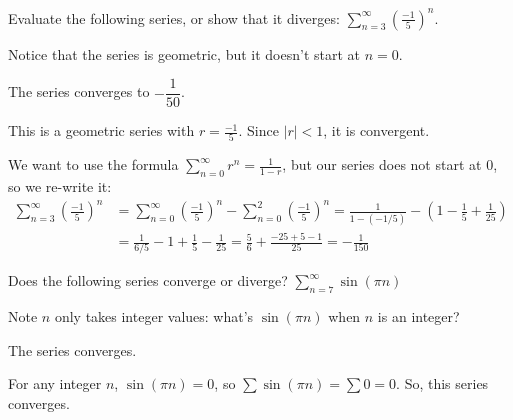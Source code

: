 



\begin{Mquestion}
Evaluate the following series, or show that it diverges:
$\displaystyle\sum_{n=3}^\infty \left(\frac{-1}{5}\right)^n$.
\end{Mquestion}

\begin{hint}
Notice that the series is geometric, but it doesn't start at $n=0$.
\end{hint}

\begin{answer}
The series converges to $-\dfrac{1}{50}$.
\end{answer}

\begin{solution}
This is a geometric series with $r=\frac{-1}{5}$. Since $|r|<1$, it is convergent.

We want to use the formula $\sum_{n=0}^\infty r^n=\frac{1}{1-r}$, but our series does not start at 0, so we re-write it:
\begin{align*}
\sum_{n=3}^\infty \left(\frac{-1}{5}\right)^n&=
\sum_{n=0}^\infty \left(\frac{-1}{5}\right)^n-
\sum_{n=0}^2 \left(\frac{-1}{5}\right)^n
=\frac{1}{1-(-1/5)} - \left(1-\frac{1}{5}+\frac{1}{25} \right)\\
&=\frac{1}{6/5}-1+\frac{1}{5}-\frac{1}{25}
=
\frac{5}{6}+\frac{-25+5-1}{25}=-\frac{1}{150}
\end{align*}
\end{solution}









\begin{question}
Does the following series converge or diverge?
$\displaystyle\sum_{n=7}^\infty \sin(\pi n)$
\end{question}

\begin{hint}
Note $n$ only takes integer values: what's $\sin(\pi n)$ when $n$ is an integer?
\end{hint}

\begin{answer}
The series converges.
\end{answer}

\begin{solution}
For any integer $n$, $\sin(\pi n)=0$, so
$\sum \sin(\pi n)=\sum 0 = 0$. So, this series converges.
\end{solution}


